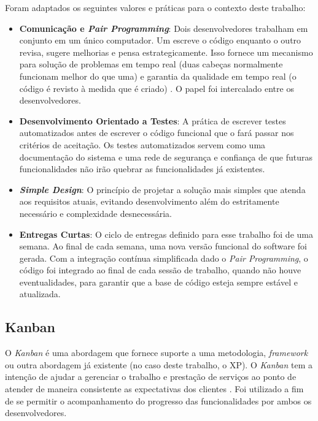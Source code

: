
Foram adaptados os seguintes valores e práticas para o contexto deste trabalho: 

\begin{itemize}
    \item \textbf{Comunicação e \textit{Pair Programming}}:
    Dois desenvolvedores trabalham em conjunto em um único computador. Um escreve o código  enquanto o outro revisa, sugere melhorias e pensa estrategicamente. Isso fornece um mecanismo para solução de problemas em tempo real (duas cabeças normalmente funcionam melhor do que uma) e garantia da qualidade em tempo real (o código é revisto à medida que é criado) \cite{pressman2021engenharia}. O papel foi intercalado entre os desenvolvedores.

    \item \textbf{Desenvolvimento Orientado a Testes}:
    A prática de escrever testes automatizados antes de escrever o código funcional que o fará passar nos critérios de aceitação. Os testes automatizados servem como uma documentação do sistema e uma rede de segurança e confiança de que futuras funcionalidades não irão quebrar as funcionalidades já existentes.

    \item \textbf{\textit{Simple Design}}:
    O princípio de projetar a solução mais simples que atenda aos requisitos atuais, evitando desenvolvimento além do estritamente necessário e complexidade desnecessária.

    \item \textbf{Entregas Curtas}:
    O ciclo de entregas definido para esse trabalho foi de uma semana. Ao final de cada semana, uma nova versão funcional do software foi gerada. Com a integração contínua simplificada dado o \textit{Pair Programming}, o código foi integrado ao final de cada sessão de trabalho, quando não houve eventualidades, para garantir que a base de código esteja sempre estável e atualizada.
\end{itemize}

\subsection[Kanban]{Kanban}
O \textit{Kanban} é uma abordagem que fornece suporte a uma metodologia, \textit{framework} ou outra abordagem já existente (no caso deste trabalho, o XP). O \textit{Kanban} tem a intenção de ajudar a gerenciar o trabalho e prestação de serviços ao ponto de atender de maneira consistente as expectativas dos clientes \cite{Bartel2021}. Foi utilizado a fim de se permitir o acompanhamento do progresso das funcionalidades por ambos os desenvolvedores.

